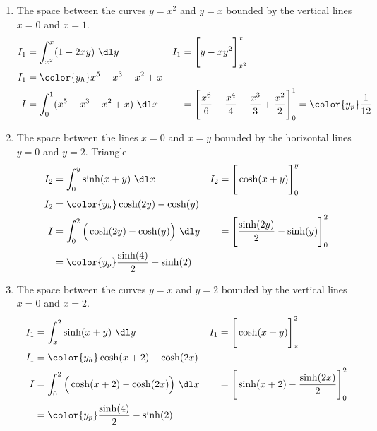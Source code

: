 \begin{enumerate}
    \item The space between the curves $ y = x^2 $ and $ y = x $ bounded by the vertical
          lines $ x = 0 $ and $ x = 1 $.
          \begin{align}
              I_1 & = \int_{x^2}^{x} (1 - 2xy)\ \dl y                      &
              I_1 & = \Bigg[ y - xy^2 \Bigg]_{x^2}^{x}                       \\
              I_1 & = \color{y_h} x^5 - x^3 - x^2 + x                        \\
              I   & = \int_{0}^{1} (x^5 - x^3 - x^2 + x)\ \dl x            &
                  & = \Bigg[ \frac{x^6}{6} - \frac{x^4}{4} - \frac{x^3}{3}
                  + \frac{x^2}{2} \Bigg]_0^1  = \color{y_p} \frac{1}{12}
          \end{align}

    \item The space between the lines $ x = 0 $ and $ x = y $ bounded by the horizontal
          lines $ y = 0 $ and $ y = 2 $. Triangle
          \begin{align}
              I_2 & = \int_{0}^{y} \sinh(x + y)\ \dl x                     &
              I_2 & = \Bigg[ \cosh(x + y) \Bigg]_{0}^{y}                     \\
              I_2 & = \color{y_h} \cosh(2y) - \cosh(y)                       \\
              I   & = \int_{0}^{2} \Big( \cosh(2y) - \cosh(y) \Big)\ \dl y &
                  & = \Bigg[ \frac{\sinh(2y)}{2} - \sinh(y) \Bigg]_0^2       \\
                  & = \color{y_p} \frac{\sinh(4)}{2} - \sinh(2)
          \end{align}

    \item The space between the curves $ y = x $ and $ y = 2 $ bounded by the vertical
          lines $ x = 0 $ and $ x = 2 $.
          \begin{align}
              I_1 & = \int_{x}^{2} \sinh(x + y)\ \dl y                        &
              I_1 & = \Bigg[ \cosh(x + y) \Bigg]_{x}^{2}                        \\
              I_1 & = \color{y_h} \cosh(x + 2) - \cosh(2x)                      \\
              I   & = \int_{0}^{2} \Big(\cosh(x + 2) - \cosh(2x)\Big) \ \dl x &
                  & = \Bigg[ \sinh(x + 2) - \frac{\sinh(2x)}{2} \Bigg]_0^2      \\
                  & = \color{y_p} \frac{\sinh(4)}{2} - \sinh(2)
          \end{align}


\end{enumerate}
